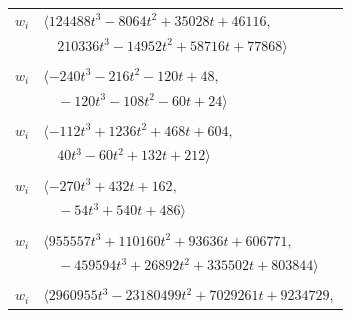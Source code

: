 \documentclass[11pt]{article}
\begin{document}
\begin{longtable}{@{}ll@{}}
$w_i$ & $\langle 124488t^{3}-8064t^{2}+35028t+46116,$\\
 & $\quad 210336t^{3}-14952t^{2}+58716t+77868\rangle$\\
\addlinespace[2pt]
\multicolumn{2}{@{}p{0.97\textwidth}@{}}{$i=32$, $D_i=4$, $\rho_{ij}$: $24{:}2, \allowbreak 26{:}2, \allowbreak 29{:}1, \allowbreak 51{:}2, \allowbreak 56{:}1, \allowbreak 62{:}1, \allowbreak 64{:}1, \allowbreak 71{:}1$}\\
$w_i$ & $\langle -240t^{3}-216t^{2}-120t+48,$\\
 & $\quad -120t^{3}-108t^{2}-60t+24\rangle$\\
\addlinespace[2pt]
\multicolumn{2}{@{}p{0.97\textwidth}@{}}{$i=33$, $D_i=8$, $\rho_{ij}$: $2{:}2, \allowbreak 3{:}2, \allowbreak 7{:}2, \allowbreak 8{:}1, \allowbreak 21{:}2, \allowbreak 26{:}1, \allowbreak 28{:}1, \allowbreak 29{:}2, \allowbreak 36{:}2, \allowbreak 42{:}1, \allowbreak 47{:}1, \allowbreak 58{:}1$}\\
$w_i$ & $\langle -112t^{3}+1236t^{2}+468t+604,$\\
 & $\quad 40t^{3}-60t^{2}+132t+212\rangle$\\
\addlinespace[2pt]
\multicolumn{2}{@{}p{0.97\textwidth}@{}}{$i=34$, $D_i=18$, $e_i=1$, $\rho_{ij}$: $13{:}2, \allowbreak 25{:}2, \allowbreak 27{:}2, \allowbreak 38{:}1, \allowbreak 66{:}1, \allowbreak 67{:}2$}\\
$w_i$ & $\langle -270t^{3}+432t+162,$\\
 & $\quad -54t^{3}+540t+486\rangle$\\
\addlinespace[2pt]
\multicolumn{2}{@{}p{0.97\textwidth}@{}}{$i=35$, $D_i=144$, $e_i=0$, $\rho_{ij}$: $1{:}1, \allowbreak 3{:}1, \allowbreak 5{:}2, \allowbreak 26{:}1, \allowbreak 28{:}2, \allowbreak 29{:}2, \allowbreak 38{:}1, \allowbreak 39{:}2, \allowbreak 41{:}1, \allowbreak 54{:}2, \allowbreak 59{:}2, \allowbreak 63{:}1$}\\
$w_i$ & $\langle 955557t^{3}+110160t^{2}+93636t+606771,$\\
 & $\quad -459594t^{3}+26892t^{2}+335502t+803844\rangle$\\
\addlinespace[2pt]
\multicolumn{2}{@{}p{0.97\textwidth}@{}}{$i=36$, $D_i=24$, $e_i=1$, $\rho_{ij}$: $2{:}1, \allowbreak 5{:}2, \allowbreak 12{:}2, \allowbreak 16{:}2, \allowbreak 17{:}2, \allowbreak 19{:}2, \allowbreak 27{:}1, \allowbreak 33{:}1, \allowbreak 48{:}1, \allowbreak 55{:}2, \allowbreak 58{:}2, \allowbreak 62{:}1, \allowbreak 66{:}1, \allowbreak 67{:}2, \allowbreak 69{:}2$}\\
$w_i$ & $\langle 2960955t^{3}-23180499t^{2}+7029261t+9234729,$\\

\end{longtable}
\end{document}
